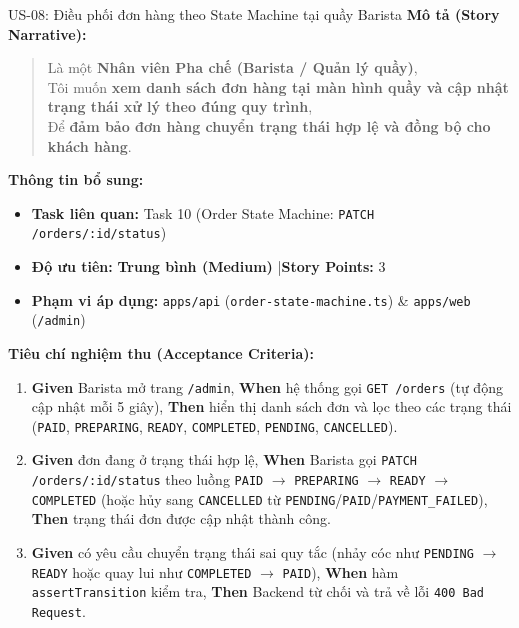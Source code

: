 \documentclass[12pt,a4paper]{article}
\begin{document}
\vspace{0.4cm}

\begin{userstorybox}{US-08: Điều phối đơn hàng theo State Machine tại quầy Barista}
    \textbf{Mô tả (Story Narrative):}
    \begin{quote}
        Là một \textbf{Nhân viên Pha chế (Barista / Quản lý quầy)},\\
        Tôi muốn \textbf{xem danh sách đơn hàng tại màn hình quầy và cập nhật trạng thái xử lý theo đúng quy trình},\\
        Để \textbf{đảm bảo đơn hàng chuyển trạng thái hợp lệ và đồng bộ cho khách hàng}.
    \end{quote}

    \textbf{Thông tin bổ sung:}
    \begin{itemize}[noitemsep]
        \item \textbf{Task liên quan:} Task 10 (Order State Machine: \texttt{PATCH /orders/:id/status})
        \item \textbf{Độ ưu tiên:} \textcolor{tagmedium}{\textbf{Trung bình (Medium)}} \quad|\quad \textbf{Story Points:} 3
        \item \textbf{Phạm vi áp dụng:} \texttt{apps/api} (\texttt{order-state-machine.ts}) \& \texttt{apps/web} (\texttt{/admin})
    \end{itemize}

    \textbf{Tiêu chí nghiệm thu (Acceptance Criteria):}
    \begin{enumerate}[noitemsep]
        \item \textbf{Given} Barista mở trang \texttt{/admin}, \textbf{When} hệ thống gọi \texttt{GET /orders} (tự động cập nhật mỗi 5 giây), \textbf{Then} hiển thị danh sách đơn và lọc theo các trạng thái (\texttt{PAID}, \texttt{PREPARING}, \texttt{READY}, \texttt{COMPLETED}, \texttt{PENDING}, \texttt{CANCELLED}).
        \item \textbf{Given} đơn đang ở trạng thái hợp lệ, \textbf{When} Barista gọi \texttt{PATCH /orders/:id/status} theo luồng \texttt{PAID} $\rightarrow$ \texttt{PREPARING} $\rightarrow$ \texttt{READY} $\rightarrow$ \texttt{COMPLETED} (hoặc hủy sang \texttt{CANCELLED} từ \texttt{PENDING}/\texttt{PAID}/\texttt{PAYMENT\_FAILED}), \textbf{Then} trạng thái đơn được cập nhật thành công.
        \item \textbf{Given} có yêu cầu chuyển trạng thái sai quy tắc (nhảy cóc như \texttt{PENDING} $\rightarrow$ \texttt{READY} hoặc quay lui như \texttt{COMPLETED} $\rightarrow$ \texttt{PAID}), \textbf{When} hàm \texttt{assertTransition} kiểm tra, \textbf{Then} Backend từ chối và trả về lỗi \texttt{400 Bad Request}.
    \end{enumerate}
\end{userstorybox}
\end{document}
